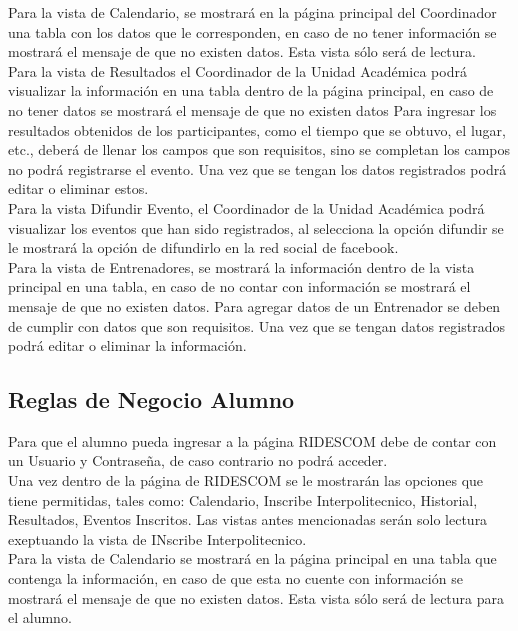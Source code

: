 	Para la vista de Calendario, se mostrará en la página principal del Coordinador una tabla con los datos que le corresponden, en caso de no tener información se mostrará el mensaje de que no existen datos. Esta vista sólo será de lectura.\\
	
	Para la vista de Resultados el Coordinador de la Unidad Académica podrá visualizar la información en una tabla dentro de la página principal, en caso de no tener datos se mostrará el mensaje de que no existen datos Para ingresar los resultados obtenidos de los participantes, como el tiempo que se obtuvo, el lugar, etc., deberá de llenar los campos que son requisitos, sino se completan los campos no podrá registrarse el evento. Una vez que se tengan los datos registrados podrá editar o eliminar estos.\\
	
	Para la vista Difundir Evento, el Coordinador de la Unidad Académica podrá visualizar los eventos que han sido registrados, al selecciona la opción difundir se le mostrará la opción de difundirlo en la red social de facebook.\\
	
	Para la vista de Entrenadores, se mostrará la información dentro de la vista principal en una tabla, en caso de no contar con información se mostrará el mensaje de que no existen datos. Para agregar datos de un Entrenador se deben de cumplir con datos que son requisitos. Una vez que se tengan datos registrados podrá editar o eliminar la información. \\
	
	\subsection{Reglas de Negocio Alumno}
	Para que el alumno pueda ingresar a la página RIDESCOM debe de contar con un Usuario y Contraseña, de caso contrario no podrá acceder.\\
	
	Una vez dentro de la página de RIDESCOM se le mostrarán las opciones que tiene permitidas, tales como: Calendario, Inscribe Interpolitecnico, Historial,  Resultados, Eventos Inscritos. Las vistas antes mencionadas serán solo lectura exeptuando la vista de INscribe Interpolitecnico.\\
	
	Para la vista de Calendario se mostrará en la página principal en una tabla que contenga la información, en caso de que esta no cuente con información se mostrará el mensaje de que no existen datos. Esta vista sólo será de lectura para el alumno.\\
	
